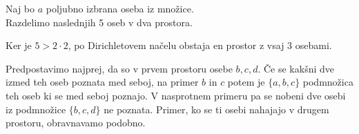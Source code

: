 \begin{enumerate}[label=\roman*.]
\begin{center}
    \end{center}
    
    Naj bo $a$ poljubno izbrana oseba iz množice. \\
    Razdelimo naslednjih 5 oseb v dva prostora.
    \begin{center}
        
    \end{center}
    Ker je $5 > 2 \cdot 2$, po Dirichletovem načelu obstaja en prostor z vsaj 3 osebami.
    \begin{center}
    \end{center}
    Predpostavimo najprej, da so v prvem prostoru osebe $b, c, d$. Če se kakšni dve izmed teh oseb poznata med seboj, na primer $b$ in $c$ potem je $\{a, b, c\}$ podmnožica teh oseb ki se med seboj poznajo. V nasprotnem primeru pa se nobeni dve osebi iz podmnožice $\{b, c, d\}$ ne poznata. Primer, ko se ti osebi nahajajo v drugem prostoru, obravnavamo podobno.
\end{enumerate}
